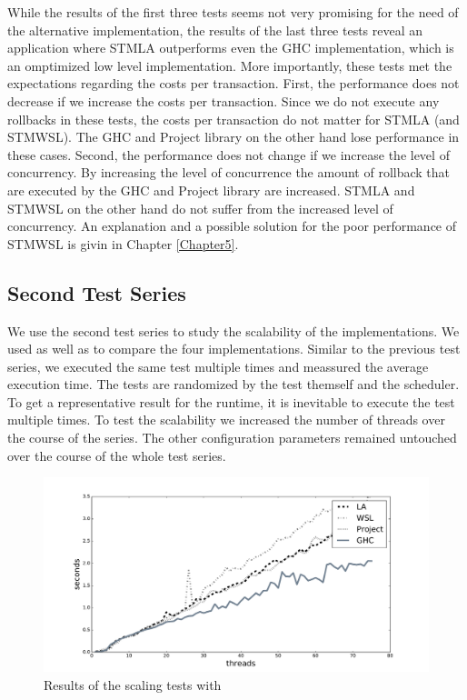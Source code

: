 While the results of the first three tests seems not very promising for the need of the alternative implementation, the results
of the last three tests reveal an application where STMLA outperforms even the GHC implementation, which is an omptimized low 
level  implementation. More importantly, these tests met the expectations regarding the costs per transaction. First,
the performance does not decrease if we increase the costs per transaction. Since we do not execute any rollbacks in these 
tests, the costs per transaction do not matter for STMLA (and STMWSL). The GHC and Project library on the other hand 
lose performance in these cases. Second, the performance does not change if we increase the level of concurrency. By increasing
the level of concurrence the amount of rollback that are executed by the GHC and Project library are increased. STMLA and STMWSL
on the other hand do not suffer from the increased level of concurrency. 
An explanation and a possible solution for the poor performance of STMWSL is givin in Chapter \ref{Chapter5}.


\subsection{Second Test Series}
We use the second test series to study the scalability of the implementations. We used  as well as
 to compare the four implementations. Similar to the previous test series, we executed the
same test multiple times and meassured the average execution time. The tests are randomized by the test themself 
and the scheduler. To get a representative result for the runtime, it is inevitable to execute the test multiple 
times. To test the scalability we increased the number of threads over the course of the series. The other 
configuration parameters remained untouched over the course of the whole test series. 
\begin{figure}
 \centering
 \includegraphics[scale=0.4]{Figures/Scaling1}
\caption[Runtime: Scaling Test I]{Results of the scaling tests with }
\label{fig:scaling1}
\end{figure}

